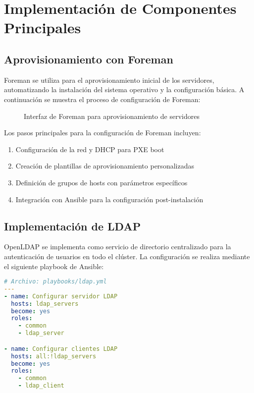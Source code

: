 \documentclass[12pt,a4paper]{report}
\begin{document}
\section{Implementación de Componentes Principales}

\subsection{Aprovisionamiento con Foreman}

Foreman se utiliza para el aprovisionamiento inicial de los servidores, automatizando la instalación del sistema operativo y la configuración básica. A continuación se muestra el proceso de configuración de Foreman:

\begin{figure}[H]
\centering
\caption{Interfaz de Foreman para aprovisionamiento de servidores}
\label{fig:foreman_interface}
\end{figure}

Los pasos principales para la configuración de Foreman incluyen:

\begin{enumerate}
    \item Configuración de la red y DHCP para PXE boot
    \item Creación de plantillas de aprovisionamiento personalizadas
    \item Definición de grupos de hosts con parámetros específicos
    \item Integración con Ansible para la configuración post-instalación
\end{enumerate}

\subsection{Implementación de LDAP}

OpenLDAP se implementa como servicio de directorio centralizado para la autenticación de usuarios en todo el clúster. La configuración se realiza mediante el siguiente playbook de Ansible:

\begin{lstlisting}[language=yaml]
# Archivo: playbooks/ldap.yml
---
- name: Configurar servidor LDAP
  hosts: ldap_servers
  become: yes
  roles:
    - common
    - ldap_server

- name: Configurar clientes LDAP
  hosts: all:!ldap_servers
  become: yes
  roles:
    - common
    - ldap_client
\end{lstlisting}
\end{document}
